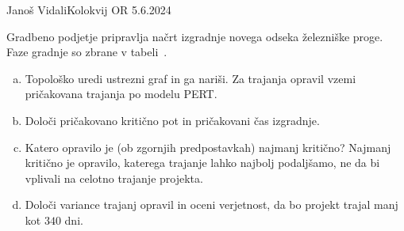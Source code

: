 \begin{naloga}{Janoš Vidali}{Kolokvij OR 5.6.2024}
\begin{vprasanje}
Gradbeno podjetje pripravlja načrt izgradnje novega odseka železniške proge.
Faze gradnje so zbrane v tabeli~\tab.

\begin{enumerate}[(a)]
\item Topološko uredi ustrezni graf in ga nariši.
Za trajanja opravil vzemi pričakovana trajanja po modelu PERT.

\item Določi pričakovano kritično pot in pričakovani čas izgradnje.

\item Katero opravilo je (ob zgornjih predpostavkah) najmanj kritično?
Najmanj kritično je opravilo, katerega trajanje lahko najbolj podaljšamo,
ne da bi vplivali na celotno trajanje projekta.

\item Določi variance trajanj opravil in oceni ve\-rjet\-nost,
da bo projekt trajal manj kot $340$ dni.
\end{enumerate}
%
\begin{tabela}
\end{tabela}
\end{vprasanje}


\end{naloga}
